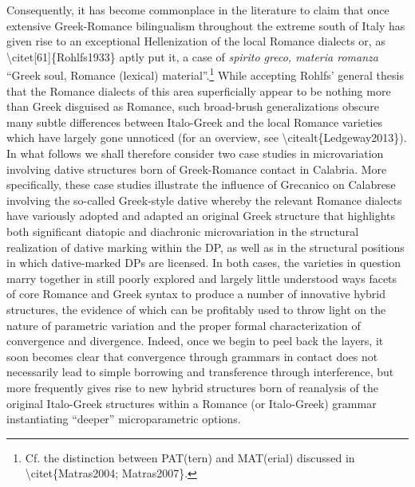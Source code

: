 \documentclass[output=paper,modfonts,nonflat]{langsci/langscibook}
\begin{document}
\begin{styleStandard}
Consequently, it has become commonplace in the literature to claim that once extensive Greek-Romance bilingualism throughout the extreme south of Italy has given rise to an exceptional Hellenization of the local Romance dialects or, as {\textbackslash}citet[61]\{Rohlfs1933\} aptly put it, a case of \textit{spirito greco, materia romanza }“Greek soul, Romance (lexical) material”.\footnote{ Cf. the distinction between PAT(tern) and MAT(erial) discussed in {\textbackslash}citet\{Matras2004; Matras2007\}.} While accepting Rohlfs’ general thesis that the Romance dialects of this area superficially appear to be nothing more than Greek disguised as Romance, such broad-brush generalizations obscure many subtle differences between Italo-Greek and the local Romance varieties which have largely gone unnoticed (for an overview, see {\textbackslash}citealt\{Ledgeway2013\}). In what follows we shall therefore consider two case studies in microvariation involving dative structures born of Greek-Romance contact in Calabria. More specifically, these case studies illustrate the influence of Grecanico on Calabrese involving the so-called Greek-style dative whereby the relevant Romance dialects have variously adopted and adapted an original Greek structure that highlights both significant diatopic and diachronic microvariation in the structural realization of dative marking within the DP, as well as in the structural positions in which dative-marked DPs are licensed. In both cases, the varieties in question marry together in still poorly explored and largely little understood ways facets of core Romance and Greek syntax to produce a number of innovative hybrid structures, the evidence of which can be profitably used to throw light on the nature of parametric variation and the proper formal characterization of convergence and divergence. Indeed, once we begin to peel back the layers, it soon becomes clear that convergence through grammars in contact does not necessarily lead to simple borrowing and transference through interference, but more frequently gives rise to new hybrid structures born of reanalysis of the original Italo-Greek structures within a Romance (or Italo-Greek) grammar instantiating “deeper” microparametric options.
\end{styleStandard}
\end{document}
